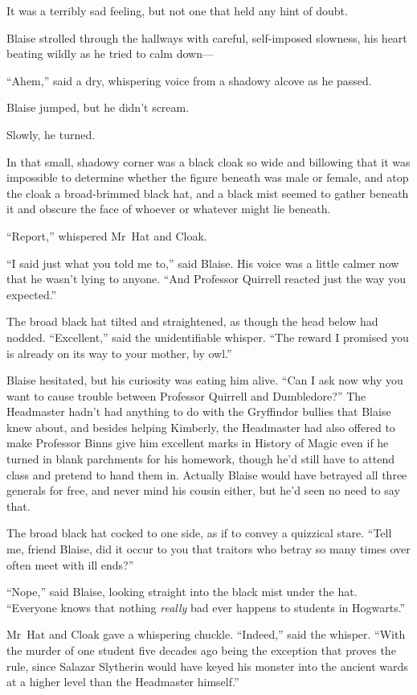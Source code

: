 It was a terribly sad feeling, but not one that held any hint of doubt.


Blaise strolled through the hallways with careful, self-imposed slowness, his heart beating wildly as he tried to calm down—

“Ahem,” said a dry, whispering voice from a shadowy alcove as he passed.

Blaise jumped, but he didn’t scream.

Slowly, he turned.

In that small, shadowy corner was a black cloak so wide and billowing that it was impossible to determine whether the figure beneath was male or female, and atop the cloak a broad-brimmed black hat, and a black mist seemed to gather beneath it and obscure the face of whoever or whatever might lie beneath.

“Report,” whispered Mr~Hat and Cloak.

“I said just what you told me to,” said Blaise. His voice was a little calmer now that he wasn’t lying to anyone. “And Professor Quirrell reacted just the way you expected.”

The broad black hat tilted and straightened, as though the head below had nodded. “Excellent,” said the unidentifiable whisper. “The reward I promised you is already on its way to your mother, by owl.”

Blaise hesitated, but his curiosity was eating him alive. “Can I ask now why you want to cause trouble between Professor Quirrell and Dumbledore?” The Headmaster hadn’t had anything to do with the Gryffindor bullies that Blaise knew about, and besides helping Kimberly, the Headmaster had also offered to make Professor Binns give him excellent marks in History of Magic even if he turned in blank parchments for his homework, though he’d still have to attend class and pretend to hand them in. Actually Blaise would have betrayed all three generals for free, and never mind his cousin either, but he’d seen no need to say that.

The broad black hat cocked to one side, as if to convey a quizzical stare. “Tell me, friend Blaise, did it occur to you that traitors who betray so many times over often meet with ill ends?”

“Nope,” said Blaise, looking straight into the black mist under the hat. “Everyone knows that nothing \emph{really} bad ever happens to students in Hogwarts.”

Mr~Hat and Cloak gave a whispering chuckle. “Indeed,” said the whisper. “With the murder of one student five decades ago being the exception that proves the rule, since Salazar Slytherin would have keyed his monster into the ancient wards at a higher level than the Headmaster himself.”

